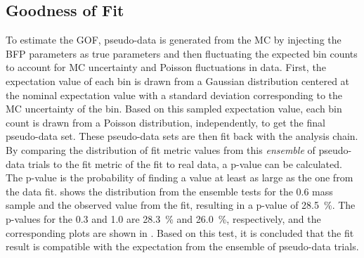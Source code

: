 \subsection{Goodness of Fit} 

To estimate the GOF, pseudo-data is generated from the MC by injecting the BFP parameters as true parameters and then fluctuating the expected bin counts to account for MC uncertainty and Poisson fluctuations in data. First, the expectation value of each bin is drawn from a Gaussian distribution centered at the nominal expectation value with a standard deviation corresponding to the MC uncertainty of the bin. Based on this sampled expectation value, each bin count is drawn from a Poisson distribution, independently, to get the final pseudo-data set. These pseudo-data sets are then fit back with the analysis chain. By comparing the distribution of fit metric values from this \textit{ensemble} of pseudo-data trials to the fit metric of the fit to real data, a p-value can be calculated. The p-value is the probability of finding a value at least as large as the one from the data fit.  shows the distribution from the ensemble tests for the \SI{0.6}{\gev} mass sample and the observed value from the fit, resulting in a p-value of \SI{28.5}{\percent}. The p-values for the \SI{0.3}{\gev} and \SI{1.0}{\gev} are \SI{28.3}{\percent} and \SI{26.0}{\percent}, respectively, and the corresponding plots are shown in . Based on this test, it is concluded that the fit result is compatible with the expectation from the ensemble of pseudo-data trials.

